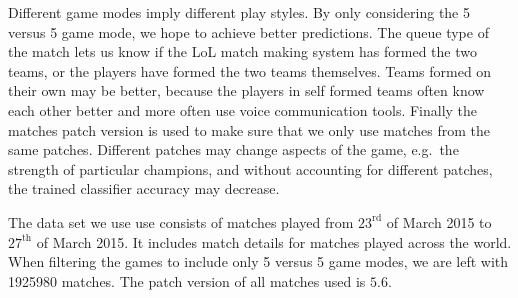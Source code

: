 Different game modes imply different play styles. By only considering the 5 versus 5 game mode, we hope to achieve better predictions.
The queue type of the match lets us know if the LoL match making system has formed the two teams, or the players have formed the two teams themselves.
Teams formed on their own may be better, because the players in self formed teams often know each other better and more often use voice communication tools.
Finally the matches patch version is used to make sure that we only use matches from the same patches. Different patches may change aspects of the game, e.g.\ the strength of particular champions, and without accounting for different patches, the trained classifier accuracy may decrease.  

The data set we use use consists of matches played from $23^{\text{rd}}$ of March 2015 to $27^{\text{th}}$ of March 2015. It includes match details for matches played across the world. When filtering the games to include only 5 versus 5 game modes, we are left with 1925980 matches. The patch version of all matches used is $5.6$.


